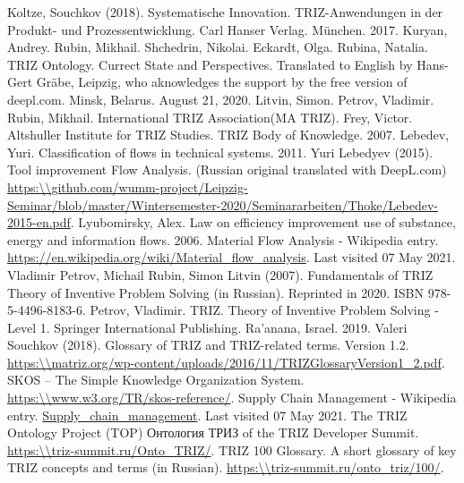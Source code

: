 \documentclass[a4paper,11pt]{article}
\begin{document}
\begin{thebibliography}{...}
     Koltze, Souchkov (2018). Systematische Innovation. TRIZ-Anwendungen in der Produkt- und Prozessentwicklung. Carl Hanser Verlag. München. 2017.
     Kuryan, Andrey. Rubin, Mikhail. Shchedrin, Nikolai. Eckardt, Olga. Rubina, Natalia. TRIZ Ontology. Currect State and Perspectives. Translated to English by Hans-Gert Gräbe, Leipzig, who aknowledges the support by the free version of deepl.com. Minsk, Belarus. August 21, 2020.
     Litvin, Simon. Petrov, Vladimir. Rubin, Mikhail. International TRIZ Association(MA TRIZ). Frey, Victor. Altshuller Institute for TRIZ Studies. TRIZ Body of Knowledge. 2007.
     Lebedev, Yuri. Classification of flows in technical systems. 2011.
     Yuri Lebedyev (2015). Tool improvement Flow Analysis. (Russian original translated with DeepL.com)
      \url{https:\\github.com/wumm-project/Leipzig-Seminar/blob/master/Wintersemester-2020/Seminararbeiten/Thoke/Lebedev-2015-en.pdf}.
     Lyubomirsky, Alex. Law on efficiency improvement use of substance, energy and information flows. 2006.
     Material Flow Analysis - Wikipedia entry.
        \url{https://en.wikipedia.org/wiki/Material_flow_analysis}. Last visited 07 May 2021.
     Vladimir Petrov, Michail Rubin, Simon Litvin (2007). Fundamentals of TRIZ Theory of Inventive Problem Solving (in Russian). Reprinted in 2020. ISBN 978-5-4496-8183-6.
     Petrov, Vladimir. TRIZ. Theory of Inventive Problem Solving - Level 1. Springer International Publishing. Ra'anana, Israel. 2019.
     Valeri Souchkov (2018).  Glossary of TRIZ and TRIZ-related terms. Version 1.2.
        \url{https:\\matriz.org/wp-content/uploads/2016/11/TRIZGlossaryVersion1_2.pdf}. 
     SKOS -- The Simple Knowledge Organization System.
        \url{https:\\www.w3.org/TR/skos-reference/}.
     Supply Chain Management - Wikipedia entry.
        \url{Supply_chain_management}. Last visited 07 May 2021.
     The TRIZ Ontology Project (TOP) \foreignlanguage{russian}{Онтология ТРИЗ} of the TRIZ Developer Summit.
        \url{https:\\triz-summit.ru/Onto_TRIZ/}.
     TRIZ 100 Glossary. A short glossary of key TRIZ concepts and terms (in Russian).
        \url{https:\\triz-summit.ru/onto_triz/100/}.

\end{thebibliography}
\end{document}
